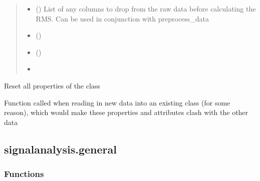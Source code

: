 \documentclass[letterpaper,10pt,english]{sphinxmanual}
\begin{document}
\begin{fulllineitems}
\begin{fulllineitems}
\begin{quote}
\begin{description}
\begin{itemize}
\item {} 
\sphinxAtStartPar
{} (\sphinxstyleliteralemphasis{\sphinxupquote{, }}) \textendash{} List of any columns to drop from the raw data before calculating the RMS. Can be used in conjunction with
preprocess\_data

\item {} 
\sphinxAtStartPar
{} (\sphinxstyleliteralemphasis{\sphinxupquote{\#}}) \textendash{} 

\item {} 
\sphinxAtStartPar
{} () \textendash{} 

\item {} 
\sphinxAtStartPar
{} \textendash{} 

\end{itemize}

\end{description}\end{quote}

\end{fulllineitems}


\begin{fulllineitems}
\label{\detokenize{_autosummary/signalanalysis.ecg.Ecg:signalanalysis.ecg.Ecg.reset}}
\sphinxAtStartPar
Reset all properties of the class

\sphinxAtStartPar
Function called when reading in new data into an existing class (for some reason), which would make these
properties and attributes clash with the other data

\end{fulllineitems}


\end{fulllineitems}



\subsection{signalanalysis.general}
\label{\detokenize{_autosummary/signalanalysis.general:module-signalanalysis.general}}\label{\detokenize{_autosummary/signalanalysis.general:signalanalysis-general}}\label{\detokenize{_autosummary/signalanalysis.general::doc}}\subsubsection*{Functions}
\end{document}
